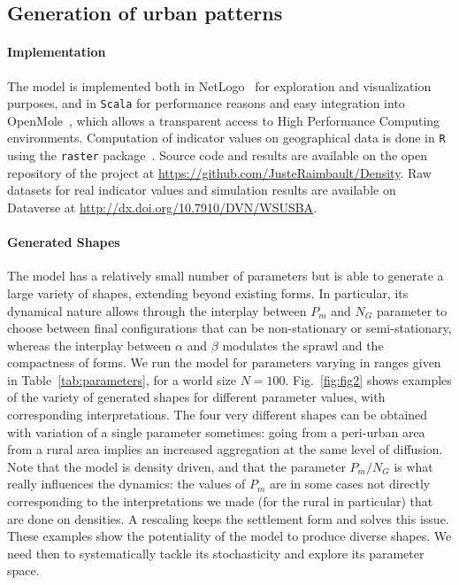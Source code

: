 \documentclass[10pt,letterpaper]{article}
\begin{document}
\subsection*{Generation of urban patterns}


\paragraph{Implementation}


The model is implemented both in NetLogo~\cite{wilensky1999netlogo} for exploration and visualization purposes, and in \texttt{Scala} for performance reasons and easy integration into OpenMole~\cite{reuillon2013openmole}, which allows a transparent access to High Performance Computing environments. Computation of indicator values on geographical data is done in \texttt{R} using the \texttt{raster} package~\cite{hijmans2015geographic}. Source code and results are available on the open repository of the project at \url{https://github.com/JusteRaimbault/Density}. Raw datasets for real indicator values and simulation results are available on Dataverse at \url{http://dx.doi.org/10.7910/DVN/WSUSBA}.


\paragraph{Generated Shapes}

The model has a relatively small number of parameters but is able to generate a large variety of shapes, extending beyond existing forms. In particular, its dynamical nature allows through the interplay between $P_m$ and $N_G$ parameter to choose between final configurations that can be non-stationary or semi-stationary, whereas the interplay between $\alpha$ and $\beta$ modulates the sprawl and the compactness of forms. We run the model for parameters varying in ranges given in Table~\ref{tab:parameters}, for a world size $N=100$. Fig.~\ref{fig:fig2} shows examples of the variety of generated shapes for different parameter values, with corresponding interpretations. The four very different shapes can be obtained with variation of a single parameter sometimes: going from a peri-urban area from a rural area implies an increased aggregation at the same level of diffusion. Note that the model is density driven, and that the parameter $P_m/N_G$ is what really influences the dynamics: the values of $P_m$ are in some cases not directly corresponding to the interpretations we made (for the rural in particular) that are done on densities. A rescaling keeps the settlement form and solves this issue. These examples show the potentiality of the model to produce diverse shapes. We need then to systematically tackle its stochasticity and explore its parameter space.
\end{document}
